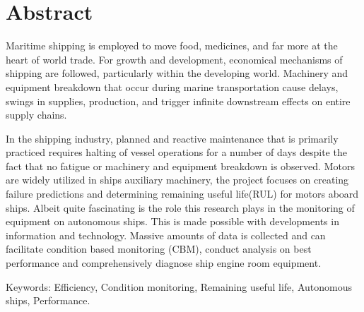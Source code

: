 
\section*{Abstract}
\label{sec:Abstract}
Maritime shipping is employed to move food, medicines, and far more at the heart of world
trade. For growth and development, economical mechanisms of shipping are followed,
particularly within the developing world. Machinery and equipment breakdown that occur
during marine transportation cause delays, swings in supplies, production, and trigger
infinite downstream effects on entire supply chains. 

In the shipping industry, planned and
reactive maintenance that is primarily practiced requires halting of vessel operations for a
number of days despite the fact that no fatigue or machinery and equipment breakdown is
observed. Motors are widely utilized in ships auxiliary machinery, the project focuses on creating failure predictions and determining remaining useful life(RUL) for motors aboard ships. Albeit quite fascinating is the role this research plays in the monitoring of equipment on autonomous ships. This is
made possible with developments in information and technology. Massive amounts of
data is collected and can facilitate condition based monitoring (CBM), conduct analysis
on best performance and comprehensively diagnose ship engine room equipment.

Keywords: Efficiency, Condition monitoring, Remaining useful life, Autonomous ships, Performance. 

 


